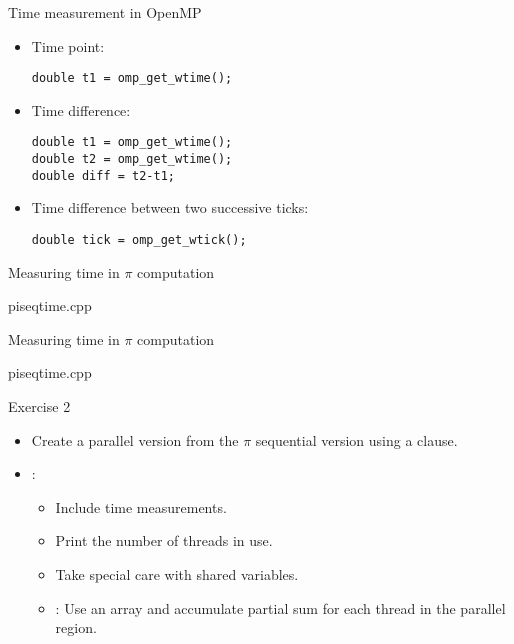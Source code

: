 \begin{frame}[t,fragile]{Time measurement in OpenMP}
\begin{itemize}

\item Time point:
\begin{lstlisting}
double t1 = omp_get_wtime();
\end{lstlisting}

\item Time difference:
\begin{lstlisting}
double t1 = omp_get_wtime();
double t2 = omp_get_wtime();
double diff = t2-t1;
\end{lstlisting}

\item Time difference between two successive ticks:
\begin{lstlisting}
double tick = omp_get_wtick();
\end{lstlisting}

\end{itemize}
\end{frame}

\begin{frame}[t]{Measuring time in $\pi$ computation}
\begin{block}{piseqtime.cpp}

\end{block}
\end{frame}

\begin{frame}[t]{Measuring time in $\pi$ computation}
\begin{block}{piseqtime.cpp}

\end{block}
\end{frame}


\begin{frame}[t]{Exercise 2}
\begin{itemize}
\item Create a parallel version from the $\pi$ sequential version
      using a  clause.

\item {}:
  \begin{itemize}
    \item Include time measurements.
    \item Print the number of threads in use.
    \item Take special care with shared variables.
    \item {}: 
           Use an array and accumulate partial sum for each thread in the parallel region.
  \end{itemize}
\end{itemize}
\end{frame}
